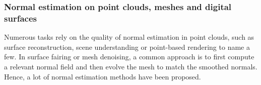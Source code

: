 

\subsubsection{Normal estimation on point clouds, meshes and digital surfaces}
\label{sec:estim:all}


Numerous tasks rely on the quality of normal estimation in point clouds, such as
surface reconstruction, scene understanding or point-based rendering to name a few.
In surface fairing or mesh denoising, a common approach is to first compute a relevant
normal field and then evolve the mesh to match the smoothed normals.
Hence, a lot of normal estimation methods have been proposed. 

